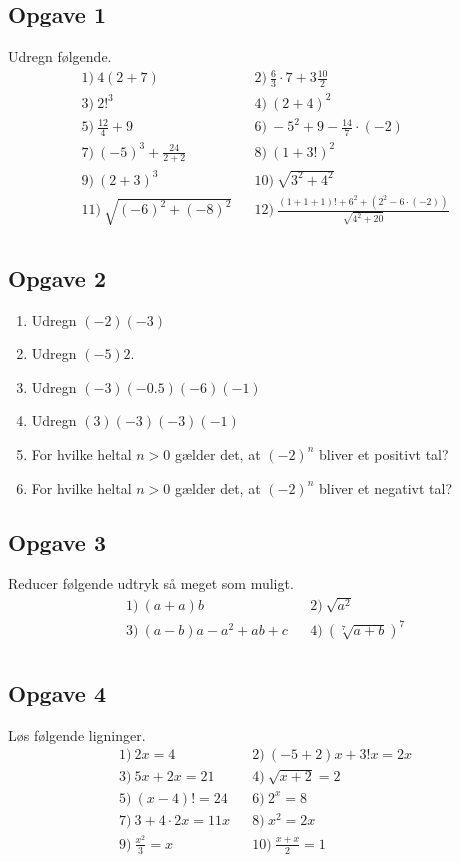 \subsection*{Opgave 1}
Udregn følgende. 
\begin{align*}
	&1) \ 4(2+7)   &&2) \   \frac{6}{3}\cdot 7+3\frac{10}{2}  \\
	&3) \ 2!^3   &&4) \  (2+4)^2   \\
	&5) \  \frac{12}{4} +9 &&6) \  -5^2+9-\frac{14}{7}\cdot(-2)   \\
	&7) \ (-5)^3+\frac{24}{2+2}    &&8) \  (1+3!)^2   \\
	&9) \  (2+3)^3  &&10) \  \sqrt{3^2+4^2}   \\
	&11) \ \sqrt{(-6)^2+(-8)^2}   &&12) \  \frac{(1+1+1)!+6^2 + (2^2-6\cdot(-2))}{\sqrt{4^2+20}}   \\
\end{align*}

\subsection*{Opgave 2}

\begin{enumerate}[label=\roman*)]
	\item Udregn $(-2)(-3)$
	\item Udregn $(-5)2$.
	\item Udregn $(-3)(-0.5)(-6)(-1)$
	\item Udregn $(3)(-3)(-3)(-1)$
	\item For hvilke heltal $n>0$ gælder det, at $(-2)^n$ bliver et positivt tal?
	\item For hvilke heltal $n>0$ gælder det, at $(-2)^n$ bliver et negativt tal?
\end{enumerate}



\subsection*{Opgave 3}
Reducer følgende udtryk så meget som muligt.
\begin{align*}
	&1) \  (a+a)b  &&2) \  \sqrt{a^2}   \\
	&3) \  (a-b)a-a^2+ab+c  &&4) \ (\sqrt[7]{a+b})^7    \\
\end{align*}


\subsection*{Opgave 4}
Løs følgende ligninger.	
\begin{align*}
	&1) \  2x = 4  &&2) \ (-5+2)x+3!x = 2x   \\
	&3) \  5x+2x = 21  &&4) \ \sqrt{x+2} = 2   \\
	&5) \  (x-4)! = 24  &&6) \  2^x = 8  \\
	&7) \  3+4\cdot 2x = 11x  &&8) \ x^2 = 2x   \\
	&9) \  \frac{x^2}{3} = x  &&10) \  \frac{x+x}{2} = 1  \\	
\end{align*}


